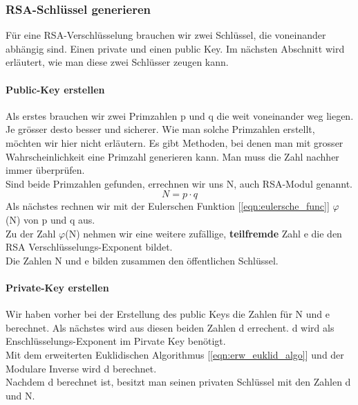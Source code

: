 \subsubsection{RSA-Schlüssel generieren}
Für eine RSA-Verschlüsselung brauchen wir zwei Schlüssel, die voneinander abhängig sind. Einen private und einen public Key. Im nächsten Abschnitt wird erläutert, wie man diese zwei Schlüsser zeugen kann.
%
\paragraph{Public-Key erstellen}\label{sec:public_key}
Als erstes brauchen wir zwei Primzahlen p und q die weit voneinander weg liegen. Je grösser desto besser und sicherer. Wie man solche Primzahlen erstellt, möchten wir hier nicht erläutern. Es gibt Methoden, bei denen man mit grosser Wahrscheinlichkeit eine Primzahl generieren kann. Man muss die Zahl nachher immer überprüfen.\\
Sind beide Primzahlen gefunden, errechnen wir uns N, auch RSA-Modul genannt.
%
\begin{equation}
  N = p \cdot q
  \label{eqn:rsa_modul}
\end{equation}
%
Als nächstes rechnen wir mit der Eulerschen Funktion [\ref{eqn:eulersche_func}] $\varphi$(N) von p und q aus.\\
Zu der Zahl $\varphi$(N) nehmen wir eine weitere zufällige, \textbf{teilfremde} Zahl e die den RSA Verschlüsselungs-Exponent bildet.\\
Die Zahlen N und e bilden zusammen den öffentlichen Schlüssel.
\paragraph{Private-Key erstellen}
Wir haben vorher bei der Erstellung des public Keys die Zahlen für N und e berechnet. Als nächstes wird aus diesen beiden Zahlen d errechent. d wird als Enschlüsselungs-Exponent im Pirvate Key benötigt.\\
Mit dem erweiterten Euklidischen Algorithmus [\ref{eqn:erw_euklid_algo}] und der Modulare Inverse wird d berechnet.\\
%
%
Nachdem d berechnet ist, besitzt man seinen privaten Schlüssel mit den Zahlen d und N.
